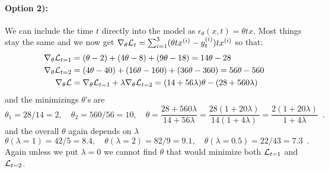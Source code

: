 \paragraph{Option 2):}
We can include the time $t$ directly into the model as $\epsilon_{\theta}(x, t) = \theta t x$.
Most things stay the same and we now get $\nabla_{\theta} \mathcal{L}_{t} = \sum_{i=1}^3 (\theta t x^{(i)} - y^{(i)}_t) t x^{(i)}$ so that:
\begin{align}
\nabla_{\theta} \mathcal{L}_{t=1} & = (\theta - 2) + (4 \theta - 8) + (9 \theta - 18) = 14 \theta - 28 \nonumber \\
\nabla_{\theta} \mathcal{L}_{t=2} & = (4 \theta - 40) + (16 \theta - 160) + (36 \theta - 360) = 56 \theta - 560 \nonumber \\
\nabla_{\theta} \mathcal{L} & = \nabla_{\theta} \mathcal{L}_{t=1} + \lambda \nabla_{\theta} \mathcal{L}_{t=2} = (14 + 56 \lambda) \theta - (28 + 560 \lambda)
\end{align}
and the minimizings $\theta$'s are 
\begin{equation}
\theta_{1} = 28/14 = 2, \quad \theta_2 = 560/56 = 10, \quad \theta = \frac{28 + 560 \lambda}{14 + 56\lambda} = \frac{28 (1 + 20 \lambda)}{14(1 + 4\lambda)} = \frac{2 (1 + 20 \lambda)}{1 + 4\lambda}\enspace .
\end{equation}
and the overall $\theta$ again depends on $\lambda$
\begin{equation}
\theta(\lambda = 1) = 42/5 = 8.4, \quad \theta(\lambda = 2) = 82/9 = 9.1, \quad \theta(\lambda = 0.5) = 22/43 = 7.3 \enspace .
\end{equation}
Again unless we put $\lambda = 0$ we cannot find $\theta$ that would minimize both $\mathcal{L}_{t=1}$ and $\mathcal{L}_{t=2}$.

